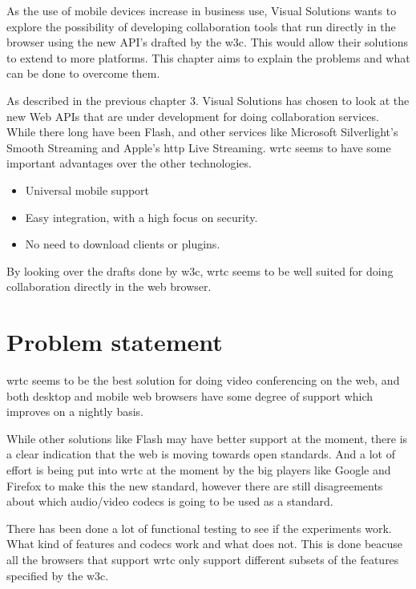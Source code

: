 
As the use of mobile devices increase in business use, Visual Solutions wants to explore the possibility of developing collaboration tools that run directly in the browser using the new API's drafted by the \gls{w3c}. This would allow their solutions to extend to more platforms. This chapter aims to explain the problems and what can be done to overcome them.

As described in the previous chapter 3. Visual Solutions has chosen to look at the new Web APIs that are under development for doing collaboration services. While there long have been Flash, and other services like Microsoft Silverlight's Smooth Streaming and Apple's \gls{http} Live Streaming. \gls{wrtc} seems to have some important advantages over the other technologies.

\begin{itemize}
    \item Universal mobile support
    \item Easy integration, with a high focus on security.
    \item No need to download clients or plugins.
\end{itemize}

By looking over the drafts done by \gls{w3c}, \gls{wrtc} seems to be well suited for doing collaboration directly in the web browser.

\section{Problem statement}
\gls{wrtc} seems to be the best solution for doing video conferencing on the web, and both desktop and mobile web browsers have some degree of support which improves on a nightly basis.

While other solutions like Flash may have better support at the moment, there is a clear indication that the web is moving towards open standards. And a lot of effort is being put into \gls{wrtc} at the moment by the big players like Google and Firefox to make this the new standard, however there are still disagreements about which audio/video codecs is going to be used as a standard.

There has been done a lot of functional testing to see if the experiments work. What kind of features and codecs work and what does not. This is done beacuse all the browsers that support \gls{wrtc} only support different subsets of the features specified by the \gls{w3c}. 

